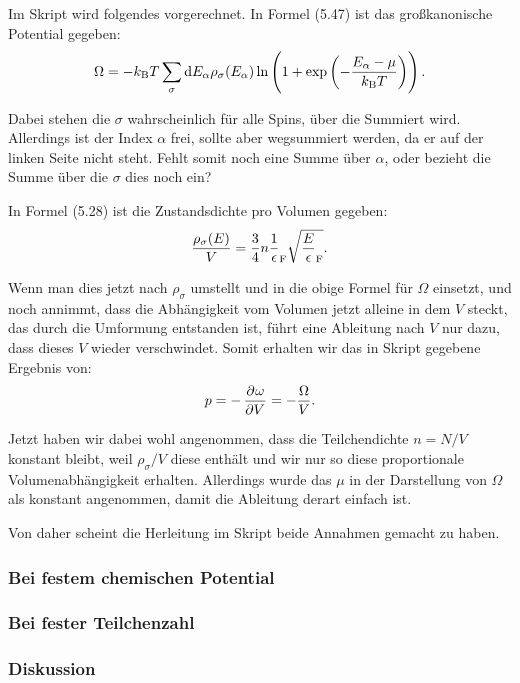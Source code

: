 Im Skript wird folgendes vorgerechnet. In Formel (5.47) ist das großkanonische Potential gegeben:
\[
    \Omega = - \kB T \sum_\sigma \dif E_\alpha \rho_\sigma(E_\alpha) \ln\del{1 + \exp\del{- \frac{E_\alpha - \mu}{\kB T}}}.
\]

Dabei stehen die $\sigma$ wahrscheinlich für alle Spins, über die Summiert wird. Allerdings ist der Index $\alpha$ frei, sollte aber wegsummiert werden, da er auf der linken Seite nicht steht. Fehlt somit noch eine Summe über $\alpha$, oder bezieht die Summe über die $\sigma$ dies noch ein?

\newcommand\EF{\epsilon_\text F}

In Formel (5.28) ist die Zustandsdichte pro Volumen gegeben:
\[
    \frac{\rho_\sigma(E)} V = \frac 34 n \frac1\EF \sqrt{\frac E\EF}.
\]

Wenn man dies jetzt nach $\rho_\sigma$ umstellt und in die obige Formel für $\Omega$ einsetzt, und noch annimmt, dass die Abhängigkeit vom Volumen jetzt alleine in dem $V$ steckt, das durch die Umformung entstanden ist, führt eine Ableitung nach $V$ nur dazu, dass dieses $V$ wieder verschwindet. Somit erhalten wir das in Skript gegebene Ergebnis von:
\[
    p = - \dpd \omega V = - \frac \Omega V.
\]

Jetzt haben wir dabei wohl angenommen, dass die Teilchendichte $n = N/V$ konstant bleibt, weil $\rho_\sigma/V$ diese enthält und wir nur so diese proportionale Volumenabhängigkeit erhalten. Allerdings wurde das $\mu$ in der Darstellung von $\Omega$ als konstant angenommen, damit die Ableitung derart einfach ist.

Von daher scheint die Herleitung im Skript beide Annahmen gemacht zu haben.

\subsubsection{Bei festem chemischen Potential}

\fehlt

\subsubsection{Bei fester Teilchenzahl}

\fehlt

\subsubsection{Diskussion}

\fehlt


